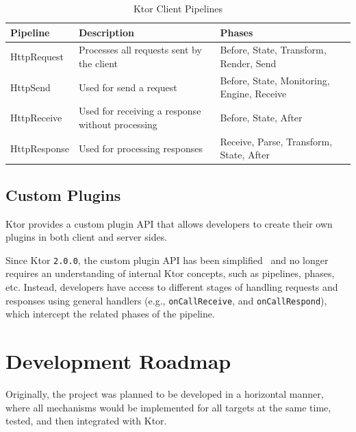 \begin{table}[!htb]
    \centering
    \caption{Ktor Client Pipelines}
    \label{tab:ktor-client-pipelines}
    \vspace{0.3cm}
    \begin{tabular}{|l|p{6cm}|p{5cm}|p{5cm}|}
        \hline
        \textbf{Pipeline} & \textbf{Description}                             & \textbf{Phases}                            \\ \hline
        HttpRequest       & Processes all requests sent by the client        & Before, State, Transform, Render, Send     \\ \hline
        HttpSend          & Used for send a request                          & Before, State, Monitoring, Engine, Receive \\ \hline
        HttpReceive       & Used for receiving a response without processing & Before, State, After                       \\ \hline
        HttpResponse      & Used for processing responses                    & Receive, Parse, Transform, State, After    \\ \hline
    \end{tabular}
\end{table}

\subsection{Custom Plugins}\label{subsec:custom-plugins}

Ktor provides a custom plugin API that allows developers to create their own plugins in both client and server sides.

Since Ktor \texttt{2.0.0}, the custom plugin API has been simplified~\cite{ktor-server-custom-plugins, ktor-client-custom-plugins} and no longer requires an understanding of internal Ktor concepts, such as pipelines, phases, etc.
Instead, developers have access to different stages of handling requests and responses using general handlers (e.g., \texttt{onCallReceive}, and \texttt{onCallRespond}), which intercept the related phases of the pipeline.

\section{Development Roadmap}\label{sec:development-roadmap}

Originally, the project was planned to be developed in a horizontal manner, where all mechanisms would be implemented for all targets at the same time, tested, and then integrated with Ktor.

